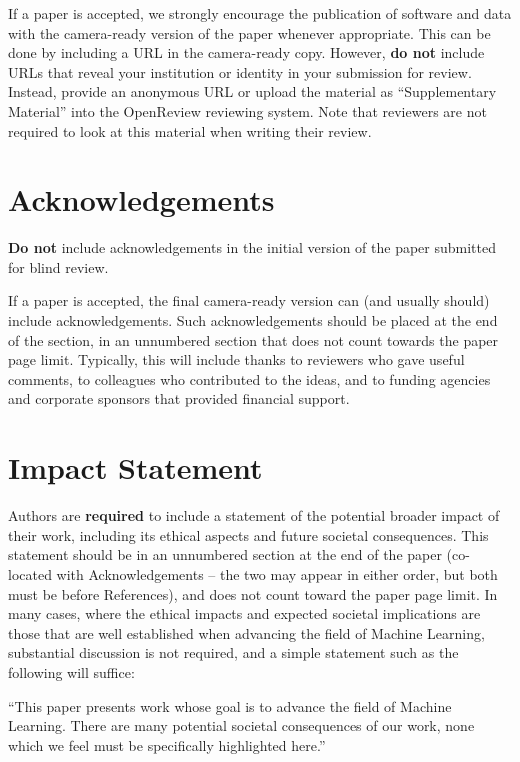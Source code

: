 \documentclass{article}
\theoremstyle{plain}
\theoremstyle{definition}
\theoremstyle{remark}
\begin{document}
If a paper is accepted, we strongly encourage the publication of software and
data with the camera-ready version of the paper whenever appropriate. This can
be done by including a URL in the camera-ready copy. However, \textbf{do not}
include URLs that reveal your institution or identity in your submission for
review. Instead, provide an anonymous URL or upload the material as
``Supplementary Material'' into the OpenReview reviewing system. Note that
reviewers are not required to look at this material when writing their review.

\section*{Acknowledgements}

\textbf{Do not} include acknowledgements in the initial version of the paper
submitted for blind review.

If a paper is accepted, the final camera-ready version can (and usually should)
include acknowledgements.  Such acknowledgements should be placed at the end of
the section, in an unnumbered section that does not count towards the paper
page limit. Typically, this will include thanks to reviewers who gave useful
comments, to colleagues who contributed to the ideas, and to funding agencies
and corporate sponsors that provided financial support.

\section*{Impact Statement}

Authors are \textbf{required} to include a statement of the potential broader
impact of their work, including its ethical aspects and future societal
consequences. This statement should be in an unnumbered section at the end of
the paper (co-located with Acknowledgements -- the two may appear in either
order, but both must be before References), and does not count toward the paper
page limit. In many cases, where the ethical impacts and expected societal
implications are those that are well established when advancing the field of
Machine Learning, substantial discussion is not required, and a simple
statement such as the following will suffice:

``This paper presents work whose goal is to advance the field of Machine
Learning. There are many potential societal consequences of our work, none
which we feel must be specifically highlighted here.''
\end{document}
